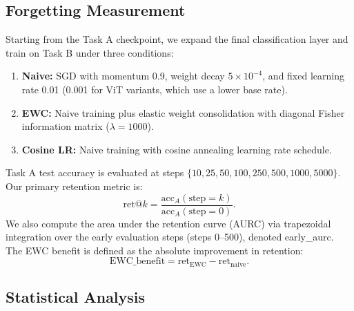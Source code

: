 \documentclass[10pt,twocolumn]{article}
\begin{document}
\subsection{Forgetting Measurement}

Starting from the Task A checkpoint, we expand the final classification layer and train on Task B under three conditions:

\begin{enumerate}
    \item \textbf{Naive:} SGD with momentum 0.9, weight decay $5 \times 10^{-4}$, and fixed learning rate 0.01 (0.001 for ViT variants, which use a lower base rate).
    \item \textbf{EWC:} Naive training plus elastic weight consolidation \citep{kirkpatrick2017overcoming} with diagonal Fisher information matrix ($\lambda = 1000$).
    \item \textbf{Cosine LR:} Naive training with cosine annealing learning rate schedule.
\end{enumerate}

Task A test accuracy is evaluated at steps $\{10, 25, 50, 100, 250, 500, 1000, 5000\}$. Our primary retention metric is:
\begin{equation}
    \text{ret}@k = \frac{\text{acc}_A(\text{step} = k)}{\text{acc}_A(\text{step} = 0)}.
    \label{eq:retention}
\end{equation}
We also compute the area under the retention curve (AURC) via trapezoidal integration over the early evaluation steps (steps 0--500), denoted early\_aurc. The EWC benefit is defined as the absolute improvement in retention:
\begin{equation}
    \text{EWC\_benefit} = \text{ret}_{\text{EWC}} - \text{ret}_{\text{naive}}.
    \label{eq:ewc_benefit}
\end{equation}

\subsection{Statistical Analysis}
\label{sec:stats}
\end{document}
